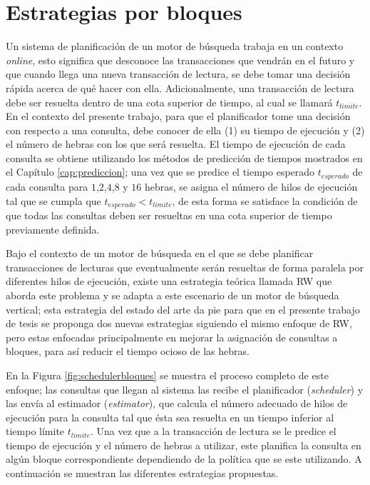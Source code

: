 \section{Estrategias por bloques}
\label{scheduling:bloques}
Un sistema de planificación de un motor de búsqueda trabaja en un contexto \textit{online}, esto significa que desconoce las transacciones que vendrán en el futuro y que cuando llega una nueva transacción de lectura, se debe tomar una decisión rápida acerca de qué hacer con ella. Adicionalmente, una transacción de lectura debe ser resuelta dentro de una cota superior de tiempo, al cual se llamará $t_{limite}$. En el contexto del presente trabajo, para que el planificador tome una decisión con respecto a una consulta, debe conocer de ella (1) su tiempo de ejecución y (2) el número de hebras con los que será resuelta. El tiempo de ejecución de cada consulta se obtiene utilizando los métodos de predicción de tiempos mostrados en el Capítulo \ref{cap:prediccion}; una vez que se predice el tiempo esperado $t_{esperado}$ de cada consulta para $1$,$2$,$4$,$8$ y $16$ hebras, se asigna el número de hilos de ejecución tal que se cumpla que $t_{esperado} < t_{limite}$, de esta forma se satisface la condición de que todas las consultas deben ser resueltas en una cota superior de tiempo previamente definida.

Bajo el contexto de un motor de búsqueda en el que se debe planificar transacciones de lecturas que eventualmente serán resueltas de forma paralela por diferentes hilos de ejecución, existe una estrategia teórica llamada RW que aborda este problema \citep{Ye:2007} y se adapta a este escenario de un motor de búsqueda vertical; esta estrategia del estado del arte da pie para que en el presente trabajo de tesis se proponga dos nuevas estrategias siguiendo el mismo enfoque de RW, pero estas enfocadas principalmente en mejorar la asignación de consultas a bloques, para así reducir el tiempo ocioso de las hebras. 

En la Figura \ref{fig:schedulerbloques} se muestra el proceso completo de este enfoque; las consultas que llegan al sistema las recibe el planificador (\textit{scheduler}) y las envía al estimador (\textit{estimator}), que calcula el número adecuado de hilos de ejecución para la consulta tal que ésta sea resuelta en un tiempo inferior al tiempo límite $t_{limite}$. Una vez que a la transacción de lectura se le predice el tiempo de ejecución y el número de hebras a utilizar, este planifica la consulta en algún bloque correspondiente dependiendo de la política que se este utilizando. A continuación se muestran las diferentes estrategias propuestas. 


